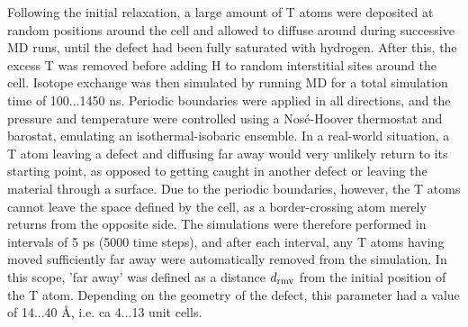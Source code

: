 Following the initial relaxation, a large amount of T atoms were deposited at random positions around the cell and allowed to diffuse around during successive MD runs, until the defect had been fully saturated with hydrogen.
After this, the excess T was removed before adding H to random interstitial sites around the cell. 
Isotope exchange was then simulated by running MD for a total simulation time of 100...1450 ns. 
Periodic boundaries were applied in all directions, and the pressure and temperature were controlled using a Nos\'{e}-Hoover thermostat and barostat, emulating an isothermal-isobaric ensemble. 
In a real-world situation, a T atom leaving a defect and diffusing far away would very unlikely return to its starting point, as opposed to getting caught in another defect or leaving the material through a surface. 
Due to the periodic boundaries, however, the T atoms cannot leave the space defined by the cell, as a border-crossing atom merely returns from the opposite side. 
The simulations were therefore performed in intervals of 5 ps (5000 time steps), and after each interval, any T atoms having moved sufficiently far away were automatically removed from the simulation. 
In this scope, 'far away' was defined as a distance $d_{\rm{rmv}} $ from the initial position of the T atom. 
Depending on the geometry of the defect, this parameter had a value of 14...40 \AA, i.e. ca 4...13 unit cells.



